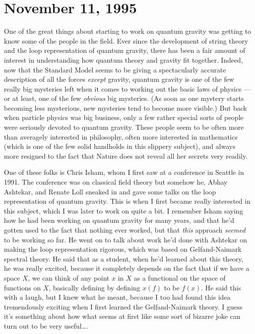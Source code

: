\documentclass{article}
\begin{document}
\hypertarget{week69}{%
\section{November 11, 1995}\label{week69}}

One of the great things about starting to work on quantum gravity was
getting to know some of the people in the field. Ever since the
development of string theory and the loop representation of quantum
gravity, there has been a fair amount of interest in understanding how
quantum theory and gravity fit together. Indeed, now that the Standard
Model seems to be giving a spectacularly accurate description of all the
forces \emph{except} gravity, quantum gravity is one of the few really
big mysteries left when it comes to working out the basic laws of
physics --- or at least, one of the few \emph{obvious} big mysteries.
(As soon as one mystery starts becoming less mysterious, new mysteries
tend to become more visible.) But back when particle physics was big
business, only a few rather special sorts of people were seriously
devoted to quantum gravity. These people seem to be often more than
averagely interested in philosophy, often more interested in mathematics
(which is one of the few solid handholds in this slippery subject), and
always more resigned to the fact that Nature does not reveal all her
secrets very readily.

One of these folks is Chris Isham, whom I first saw at a conference in
Seattle in 1991. The conference was on classical field theory but
somehow he, Abhay Ashtekar, and Renate Loll sneaked in and gave some
talks on the loop representation of quantum gravity. This is when I
first became really interested in this subject, which I was later to
work on quite a bit. I remember Isham saying how he had been working on
quantum gravity for many years, and that he'd gotten used to the fact
that nothing ever worked, but that \emph{this} approach \emph{seemed} to
be working so far. He went on to talk about work he'd done with Ashtekar
on making the loop representation rigorous, which was based on
Gelfand-Naimark spectral theory. He said that as a student, when he'd
learned about this theory, he was really excited, because it completely
depends on the fact that if we have a space \(X\), we can think of any
point \(x\) in \(X\) as a functional on the space of functions on \(X\),
basically defining by defining \(x(f)\) to be \(f(x)\). He said this
with a laugh, but I knew what he meant, because I too had found this
idea tremendously exciting when I first learned the Gelfand-Naimark
theory. I guess it's something about how what seems at first like some
sort of bizarre joke can turn out to be very useful\ldots.
\end{document}
